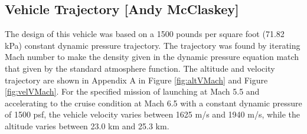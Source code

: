 \subsection{Vehicle Trajectory [Andy McClaskey]}
The design of this vehicle was based on a 1500 pounds per square foot (71.82 kPa) constant dynamic pressure trajectory. The trajectory was found by iterating Mach number to make the density given in the dynamic pressure equation match that given by the standard atmosphere function. The altitude and velocity trajectory are shown in Appendix A in Figure \ref{fig:altVMach} and Figure \ref{fig:velVMach}. For the specified mission of launching at Mach 5.5 and accelerating to the cruise condition at Mach 6.5 with a constant dynamic pressure of 1500 psf, the vehicle velocity varies between 1625 m/s and 1940 m/s, while the altitude varies between 23.0 km and 25.3 km.